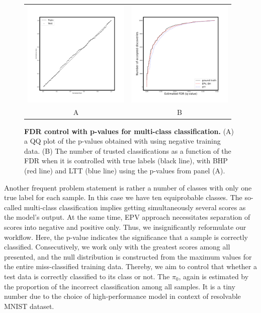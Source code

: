 \documentclass{article}
\begin{document}
\begin{figure}
    \centering
        \begin{tabular}{cc}
 		\includegraphics[width=2in]{img/cnn_QQ_multi.png} &
		\includegraphics[width=2in]{img/cnn_multi_fdr_control.png}
		\\	
		A & B
	\end{tabular}
	\caption{{\bf  FDR control with p-values for multi-class classification.}
          (A) a QQ plot of the p-values obtained with using negative training data. (B) The number of trusted classifications as a function of the FDR when it is controlled with true labels (black line), with BHP (red line) and LTT (blue line) using the p-values from panel (A).}
	\label{fig:multi}
\end{figure}

Another frequent problem statement is rather a number of classes with only one true label for each sample. In this case we have ten equiprobable classes. The so-called multi-class classification implies getting simultaneously several scores as the model's output. At the same time, EPV approach necessitates separation of scores into negative and positive only. Thus, we insignificantly reformulate our workflow. Here, the p-value indicates the significance that a sample is correctly classified. Consecutively, we work only with the greatest scores among all presented, and the null distribution is constructed from the maximum values for the entire miss-classified training data. Thereby, we aim to control that whether a test data is correctly classified to its class or not. The $\pi_0$, again is estimated by the proportion of the incorrect classification among all samples. It is a tiny number due to the choice of high-performance model in context of resolvable MNIST dataset.
\end{document}
